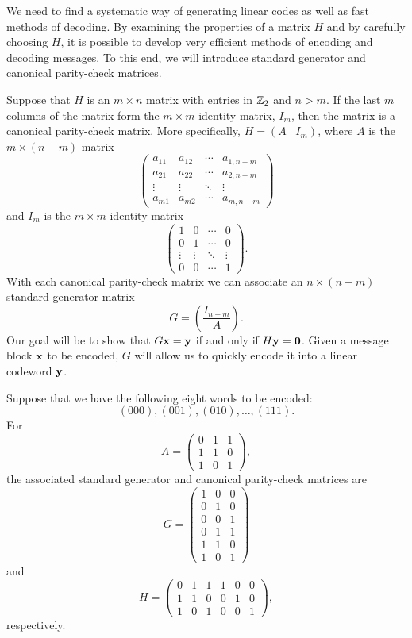  
We need to find a systematic way of generating linear codes as well as
fast methods of decoding. By examining the properties of a matrix $H$
and by carefully choosing $H$, it is possible to develop very
efficient methods of encoding and decoding messages. To this end, we 
will introduce standard generator and canonical parity-check
matrices.
 
 
Suppose that $H$ is an $m \times n$ matrix with entries in
${\Bbb Z}_2$ and $n > m$. If the last $m$ columns of the
matrix form the $m \times m$ identity matrix, $I_m$, then
the matrix is a {\bfi canonical parity-check
matrix}. More specifically, $H= (A \mid I_m
)$, where $A$ is the $m \times (n-m)$ matrix
\[
\left(
\begin{array}{cccc}
a_{11} & a_{12} & \cdots & a_{1,n-m} \\
a_{21} & a_{22} & \cdots & a_{2,n-m} \\
\vdots & \vdots & \ddots & \vdots    \\
a_{m1} & a_{m2} & \cdots & a_{m,n-m}
\end{array}
\right)
\]
and $I_m$ is the $m \times m$ identity matrix
\[
\left(
\begin{array}{cccc}
1 & 0 & \cdots & 0 \\
0 & 1 & \cdots & 0 \\
\vdots & \vdots & \ddots & \vdots \\
0 & 0 & \cdots & 1
\end{array}
\right).
\]
With each canonical parity-check matrix we can associate an $n \times
(n-m)$ {\bfi standard generator matrix} 
\[
G =
\left(
\frac{I_{n-m}}{A}
\right).
\]
Our goal will be to show that $G {\bold x} = {\bold y}$ if and only if
$H{\bold y} = {\bold 0}$.  Given a message block ${\bold x}$ to be
encoded, $G$ will allow us to quickly encode it into a linear
codeword ${\bold y}$. 
 
 
\vspace{2ex}
 
 
Suppose that we have the following eight words to be
encoded:
\[
(000), (001), (010), \ldots, (111).
\] 
For
\[
A =
\left(
\begin{array}{ccc}
0 & 1 & 1 \\
1 & 1 & 0 \\
1 & 0 & 1
\end{array}
\right),
\]
the associated standard generator and canonical parity-check matrices
are 
\[
G=
\left(
\begin{array}{ccc}
1 & 0 & 0 \\
0 & 1 & 0 \\
0 & 0 & 1 \\
0 & 1 & 1 \\
1 & 1 & 0 \\
1 & 0 & 1
\end{array}
\right)
\]
and
\[
H =
\left(
\begin{array}{cccccc}
0 & 1 & 1 & 1 & 0 & 0 \\
1 & 1 & 0 & 0 & 1 & 0 \\
1 & 0 & 1 & 0 & 0 & 1
\end{array}
\right),
\]
respectively.
 
